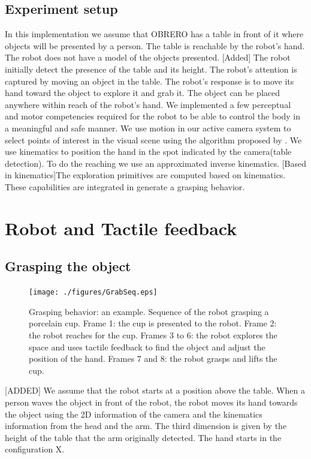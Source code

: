 \subsection{Experiment setup} In this implementation we assume that
OBRERO has a table in front of it where objects will be presented
by a person. The table is reachable by the robot's hand. The robot
does not have a model of the objects presented.
%
[Added] The robot initially detect the presence of the table and
its height.
%
The robot's attention is captured by moving an object in the
table. The robot's response is to move its hand toward the object
to explore it and grab it. The object can be placed anywhere
within reach of the robot's hand.
%
We implemented a few perceptual and motor competencies required
for the robot to be able to control the body in a meaningful and
safe manner.
%
We use motion in our active camera system to select points of
interest in the visual scene using the algorithm proposed by
\cite{kemp-thesis}. We use kinematics to position the hand in the
spot indicated by the camera(table detection). To do the reaching
we use an approximated inverse kinematics. [Based in
kinematics]The exploration primitives are computed based on
kinematics.
%
These capabilities are integrated in generate a grasping behavior.
\section{Robot and Tactile feedback}

\subsection{Grasping the object}
\label{sec:impbehavior}

\begin{figure}[htbp]
\centerline{
\texttt{[image: ./figures/GrabSeq.eps]}
} \caption[An example of the Grasping Behavior]{Grasping behavior:
an example. Sequence of the robot grasping a porcelain cup. Frame
1: the cup is presented to the robot. Frame 2: the robot reaches
for the cup. Frames 3 to 6: the robot explores the space and uses
tactile feedback to find the object and adjust the position of the
hand. Frames 7 and 8: the robot grasps and lifts the cup.}
\label{fig:sequence}
\end{figure}

[ADDED] We assume that the robot starts at a position above the
table. When a person waves the object in front of the robot, the
robot moves its hand towards the object using the 2D information
of the camera and the kinematics information from the head and the
arm. The third dimension is given by the height of the table that
the arm originally detected. The hand starts in the configuration
X.


